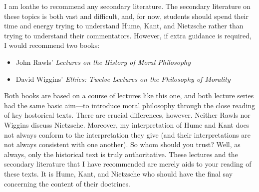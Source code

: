 I am loathe to recommend any secondary literature. The secondary literature on these topics is both vast and difficult, and, for now, students should spend their time and energy trying to understand Hume, Kant, and Nietzsche rather than trying to understand their commentators. However, if extra guidance is required, I would recommend two books:
\begin{itemize}
    \item John Rawls' \emph{Lectures on the History of Moral Philosophy}
    \item David Wiggins' \emph{Ethics: Twelve Lectures on the Philosophy of Morality}
\end{itemize}
Both books are based on a course of lectures like this one, and both lecture series had the same basic aim---to introduce moral philosophy through the close reading of key hostorical texts. There are crucial differences, however. Neither Rawls nor Wiggins discuss Nietzsche. Moreover, my interpretation of Hume and Kant does not always conform to the interpretation they give (and their interpretations are not always consistent with one another). So whom should you trust? Well, as always, only the historical text is truly authoritative. These lectures and the secondary literature that I have recommended are merely aids to your reading of these texts. It is Hume, Kant, and Nietzsche who should have the final say concerning the content of their doctrines. \change

% 


